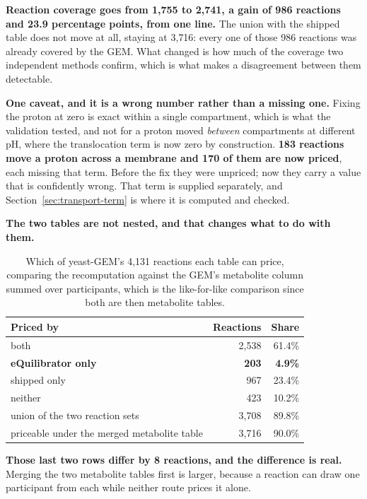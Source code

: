 \textbf{Reaction coverage goes from 1{,}755 to 2{,}741, a gain of 986 reactions and 23.9
percentage points, from one line.} The union with the shipped table does not move at all,
staying at 3{,}716: every one of those 986 reactions was already covered by the GEM. What
changed is how much of the coverage two independent methods confirm, which is what makes a
disagreement between them detectable.

\textbf{One caveat, and it is a wrong number rather than a missing one.} Fixing the proton
at zero is exact within a single compartment, which is what the validation tested, and not
for a proton moved \emph{between} compartments at different pH, where the translocation term
is now zero by construction. \textbf{183 reactions
move a proton across a membrane and 170 of them are now priced}, each missing that term.
Before the fix they were unpriced; now they carry a value that is confidently wrong. That
term is supplied separately, and
Section~\ref{sec:transport-term} is where it is computed and checked.

\textbf{The two tables are not nested, and that changes what to do with them.}

\begin{table}[!htbp]
  \centering
  \footnotesize
  \caption[Coverage overlap]{Which of yeast-GEM's 4{,}131 reactions each table can price,
  comparing the recomputation against the GEM's metabolite column summed over participants,
  which is the like-for-like comparison since both are then metabolite tables.}
  \label{tab:coverage-overlap}
  \begin{tabular}{@{}lrr@{}}
    \hline
    Priced by & Reactions & Share \\
    \hline
    both & 2{,}538 & 61.4\% \\
    \textbf{eQuilibrator only} & \textbf{203} & \textbf{4.9\%} \\
    shipped only & 967 & 23.4\% \\
    neither & 423 & 10.2\% \\
    \hline
    union of the two reaction sets & 3{,}708 & 89.8\% \\
    priceable under the merged metabolite table & 3{,}716 & 90.0\% \\
    \hline
  \end{tabular}
\end{table}

\textbf{Those last two rows differ by 8 reactions, and the difference is real.} Merging the
two metabolite tables first is larger, because a reaction can draw one participant from each
while neither route prices it alone.

